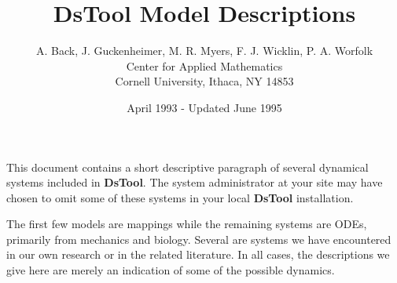 


\title{DsTool Model Descriptions}
\author{A. Back, J. Guckenheimer, M. R. Myers, F. J. Wicklin, P. A. Worfolk \\
 	Center for Applied Mathematics \\
	Cornell University, Ithaca, NY 14853}
\date{April 1993 - Updated June 1995}
\maketitle

This document contains a short descriptive paragraph of several
dynamical systems included in {\bf DsTool}.  The system
administrator at your site may have chosen to omit some of these
systems in your local {\bf DsTool} installation.

The first few models are mappings while the remaining systems are
ODEs, primarily from mechanics and biology.  Several are 
systems we have encountered in our own research or in the related
literature.  In all cases, the descriptions we give here are merely an
indication of some of the possible dynamics.























